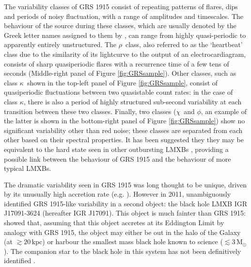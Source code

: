 \par The variability classes of GRS 1915 consist of repeating patterns of flares, dips and periods of noisy fluctuation, with a range of amplitudes and timescales.  The  behaviour of the source during these classes, which are usually denoted by the Greek letter names assigned to them by \citet{Belloni_GRS_MI}, can range from highly quasi-periodic to apparently entirely unstructured.  The $\rho$\indexrho\ class, also referred to as the `heartbeat' class due to the similarity of its lightcurve to the output of an electrocardiagram, consists of sharp quasiperiodic flares with a recurrence time of a few tens of seconds (Middle-right panel of Figure \ref{fig:GRSsample}).  Other classes, such as class $\kappa$\indexkappa\ shown in the top-left panel of Figure \ref{fig:GRSsample}, consist of quasiperiodic fluctuations between two quasistable count rates: in the case of class $\kappa$, there is also a period of highly structured sub-second variability at each transition between these two classes.  Finally, two classes ($\chi$\indexchi\ and $\phi$\indexphi, an example of the latter is shown in the bottom-right panel of Figure \ref{fig:GRSsample}) show no significant variability other than red noise; these classes are separated from each other based on their spectral properties.  It has been suggested they they may be equivalent to the hard state seen in other outbursting LMXBs \citep{VanOers_GRSHard}, providing a possible link between the behaviour of GRS 1915 and the behaviour of more typical LMXBs.
\par The dramatic variability seen in GRS 1915 was long thought to be unique, driven by its unusually high accretion rate (e.g. \citealp{Belloni_Timescales}).  However in 2011, \citet{Altamirano_IGR_FH} unambiguously identified GRS 1915-like variability in a second object: the black hole LMXB IGR J17091-3624 (hereafter IGR J17091).  This object is much fainter than GRS 1915: \citet{Altamirano_IGR_FH} showed that, assuming that this object accretes at its Eddington Limit by analogy with GRS 1915, the object may either be out in the halo of the Galaxy (at $\gtrsim20$\,kpc) or harbour the smallest mass black hole known to science ($\lesssim3$\,M$_\odot$).  The companion star to the black hole in this system has not been definitively identified \citep{Chaty_IGRCompanion}.
